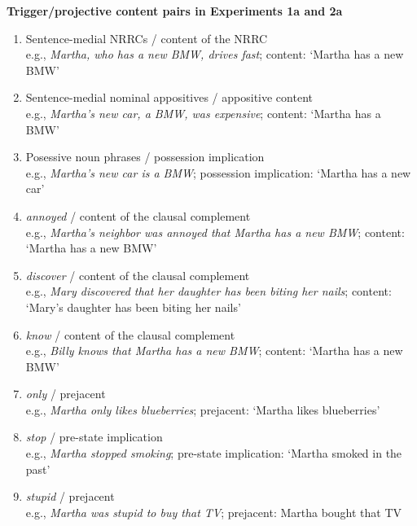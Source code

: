 \documentclass[11pt,fleqn]{article}
\newcommand{\6}{\mbox{$[\hspace*{-.6mm}[$}}
\newcommand{\9}{\mbox{$]\hspace*{-.6mm}]$}}
\begin{document}
\begin{exe}
\ex\label{pairs1a2a} {\bf Trigger/projective content pairs in Experiments 1a and 2a}

\begin{enumerate}[itemsep=-.5mm]

\item Sentence-medial NRRCs / content of the NRRC
\\ e.g., {\em Martha, who has a new BMW, drives fast}; content: `Martha has a new BMW'

\item Sentence-medial nominal appositives / appositive content
\\ e.g., {\em Martha's new car, a BMW, was expensive}; content: `Martha has a BMW'

\item Posessive noun phrases / possession implication
\\ e.g., {\em Martha's new car is a BMW}; possession implication: `Martha has a new car'

\item {\em annoyed} / content of the clausal complement
\\ e.g., {\em Martha's neighbor was annoyed that Martha has a new BMW}; content: `Martha has a new BMW'

\item {\em discover} / content of the clausal complement
\\ e.g., {\em Mary discovered that her daughter has been biting her nails}; content: `Mary's daughter has been biting her nails'

\item {\em know} / content of the clausal complement
\\ e.g., {\em Billy knows that Martha has a new BMW}; content: `Martha has a new BMW'

\item {\em only} / prejacent
\\ e.g., {\em Martha only likes blueberries}; prejacent: `Martha likes blueberries'

\item {\em stop} / pre-state implication
\\ e.g., {\em Martha stopped smoking}; pre-state implication: `Martha smoked in the past'

\item {\em stupid} / prejacent
\\ e.g., {\em Martha was stupid to buy that TV}; prejacent: Martha bought that TV


\end{enumerate}
\end{exe}
\end{document}
